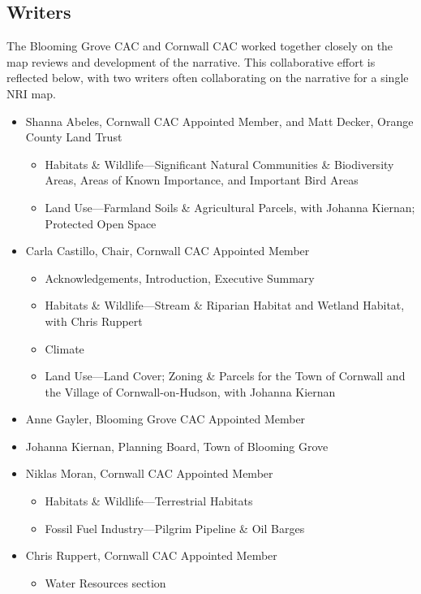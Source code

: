\subsection*{Writers}\label{subsec:writers}
The Blooming Grove CAC and Cornwall CAC worked together closely on the map 
reviews and development of the narrative. This collaborative effort is 
reflected below, with two writers often collaborating on the narrative for a 
single NRI map.
\begin{itemize}
    \item Shanna Abeles, Cornwall CAC Appointed Member, and Matt Decker, Orange 
County Land Trust
    \begin{itemize}
        \item Habitats \& Wildlife—Significant Natural Communities \& 
Biodiversity Areas, Areas of Known Importance, and Important Bird Areas
        \item Land Use—Farmland Soils \& Agricultural Parcels, with Johanna 
Kiernan; Protected Open Space
    \end{itemize}
    \item Carla Castillo, Chair, Cornwall CAC Appointed Member
    \begin{itemize}
        \item  Acknowledgements, Introduction, Executive Summary
        \item Habitats \& Wildlife—Stream \& Riparian Habitat and Wetland 
Habitat, with Chris Ruppert
        \item Climate
        \item Land Use—Land Cover; Zoning \& Parcels for the Town of Cornwall 
and the Village of Cornwall-on-Hudson, with Johanna Kiernan
    \end{itemize}
    \item Anne Gayler, Blooming Grove CAC Appointed Member
    \item Johanna Kiernan, Planning Board, Town of Blooming Grove
    \item Niklas Moran, Cornwall CAC Appointed Member
    \begin{itemize}
        \item Habitats \& Wildlife—Terrestrial Habitats
        \item Fossil Fuel Industry—Pilgrim Pipeline \& Oil Barges
    \end{itemize}
    \item Chris Ruppert, Cornwall CAC Appointed Member
    \begin{itemize}
       \item Water Resources section

\end{itemize}
\end{itemize}

